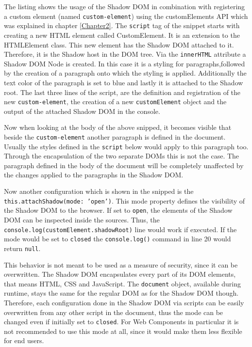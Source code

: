 The listing shows the usage of the Shadow DOM in combination with registering a custom element (named \texttt{custom-element}) using the customElements API which was explained in chapter \ref{Chapter2}.
The \texttt{script} tag of the snippet starts with creating a new HTML element called CustomElement. It is an extension to the HTMLElement class. This new element has the Shadow DOM attached to it. Therefore, it is the Shadow host in the DOM tree. Via the \texttt{innerHTML} attribute a Shadow DOM Node is created. In this case it is a styling for paragraphs,followed by the creation of a paragraph onto which the styling is applied. Additionally the text color of the paragraph is set to blue and lastly it is attached to the Shadow root.
The last three lines of the script, are the definition and registration of the new \texttt{custom-element}, the creation of a new \texttt{customElement} object and the output of the attached Shadow DOM in the console.

Now when looking at the body of the above snipped, it becomes visible that beside the \texttt{custom-element} another paragraph is defined in the document. Usually the styles defined in the \texttt{script} below would apply to this paragraph too. Through the encapsulation of the two separate DOMs this is not the case. The paragraph defined in the body of the document will be completely unaffected by the changes applied to the paragraphs in the Shadow DOM.\cite{simon_thesis}

Now another configuration which is shown in the snipped is the \texttt{this.attachShadow({mode: 'open'})}. This mode property defines the visibility of the Shadow DOM to the browser. If set to \texttt{open}, the elements of the Shadow DOM can be inspected inside the sources. Thus, the \texttt{console.log(customElement.shadowRoot)} line would work if executed. 
If the mode would be set to \texttt{closed}  the \texttt{console.log()} command in line 20 would return \texttt{null}.\cite{simon_thesis}

This behavior is not meant to be used as a measure of security, since it can be overwritten. The Shadow DOM encapsulates every part of its DOM elements, that means HTML, CSS and JavaScript. The \texttt{document} object, available during runtime, stays the same for the regular DOM as for the Shadow DOM though. Therefore, each configuration done in the Shadow DOM via scripts can be easily overwritten from any other script in the document, thus the mode can be changed even if initially set to \texttt{closed}.\cite{shadow_dom_encapsulation} For Web Components in particular it is not recommended to use this mode at all, since it would make them less flexible for end users.\cite{wc_shadow_dom_google}

